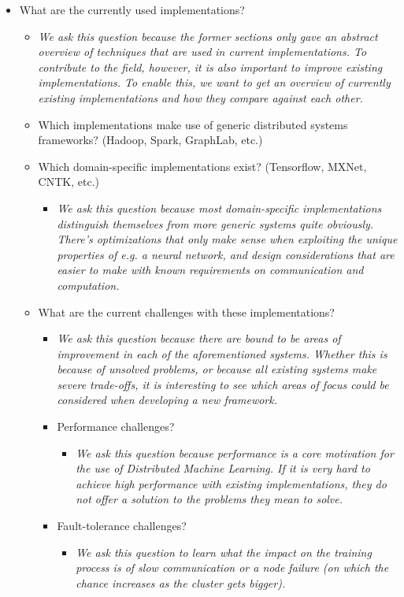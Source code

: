 \begin{itemize}
\begin{itemize}
	\end{itemize}
	\item What are the currently used implementations?
	\begin{itemize}
		\item \textit{We ask this question because the former sections only gave an abstract overview of techniques that are used in current implementations. To contribute to the field, however, it is also important to improve existing implementations. To enable this, we want to get an overview of currently existing implementations and how they compare against each other.}
		\item Which implementations make use of generic distributed systems frameworks? (Hadoop, Spark, GraphLab, etc.)
		\item Which domain-specific implementations exist? (Tensorflow, MXNet, CNTK, etc.)
		\begin{itemize}
			\item \textit{We ask this question because most domain-specific implementations distinguish themselves from more generic systems quite obviously. There’s optimizations that only make sense when exploiting the unique properties of e.g. a neural network, and design considerations that are easier to make with known requirements on communication and computation.}
		\end{itemize}
		\item What are the current challenges with these implementations?
		\begin{itemize}
			\item \textit{We ask this question because there are bound to be areas of improvement in each of the aforementioned systems. Whether this is because of unsolved problems, or because all existing systems make severe trade-offs, it is interesting to see which areas of focus could be considered when developing a new framework.}
			\item Performance challenges?
			\begin{itemize}
				\item \textit{We ask this question because performance is a core motivation for the use of Distributed Machine Learning. If it is very hard to achieve high performance with existing implementations, they do not offer a solution to the problems they mean to solve.}
			\end{itemize}
			\item Fault-tolerance challenges?
			\begin{itemize}
				\item \textit{We ask this question to learn what the impact on the training process is of slow communication or a node failure (on which the chance increases as the cluster gets bigger).}

\end{itemize}
\end{itemize}
\end{itemize}
\end{itemize}
